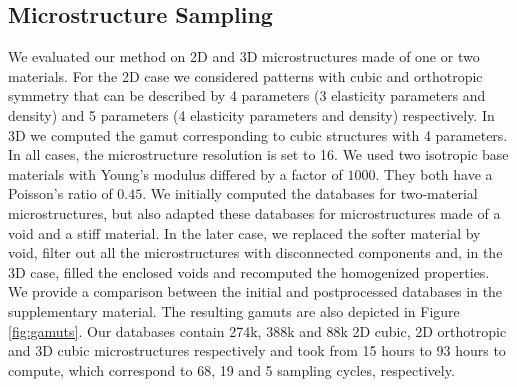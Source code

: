 \subsection{Microstructure Sampling}
We evaluated our method on 2D and 3D microstructures made of one or two materials.
For the 2D case we considered patterns with cubic and orthotropic symmetry that can be described by 4 parameters (3 elasticity parameters and density) and 5 parameters (4 elasticity parameters and density) respectively.
In 3D we computed the gamut corresponding to cubic structures with 4 parameters.
In all cases, the microstructure resolution is set to 16.
We used two isotropic base materials with Young's modulus differed by a factor of $1000$.
They both have a Poisson's ratio of $0.45$.
We initially computed the databases for two-material microstructures, but also adapted these databases for microstructures made of a void and a stiff material.
In the later case, we replaced the softer material by void, filter out all the microstructures with disconnected components and, in the 3D case, filled the enclosed voids and recomputed the homogenized properties.
We provide a comparison between the initial and postprocessed databases in the supplementary material.
The resulting gamuts are also depicted in Figure \ref{fig:gamuts}. 
Our databases contain 274k, 388k and 88k 2D cubic, 2D orthotropic and 3D cubic microstructures respectively and took from 15 hours to 93 hours to compute, which correspond to 68, 19 and 5 sampling cycles, respectively.
